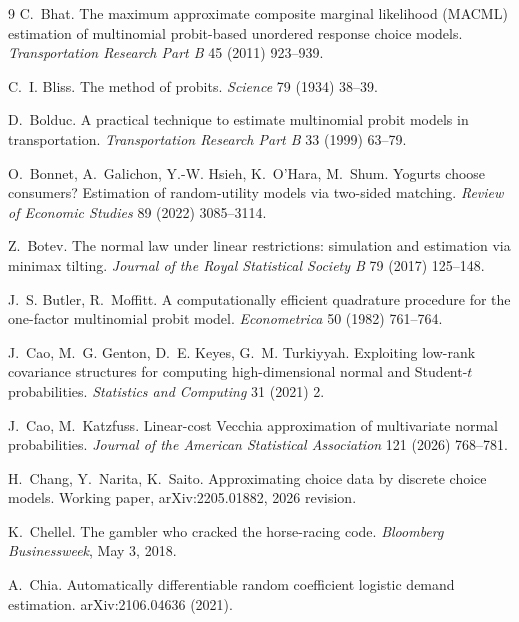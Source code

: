 \documentclass[12pt]{article}
\theoremstyle{remark}
\begin{document}
\begin{thebibliography}{9}
 C.~Bhat. The maximum approximate composite marginal
likelihood (MACML) estimation of multinomial probit-based unordered response
choice models. \emph{Transportation Research Part B} 45 (2011) 923--939.

 C.~I. Bliss. The method of probits.
\emph{Science} 79 (1934) 38--39.

 D.~Bolduc. A practical technique to
estimate multinomial probit models in transportation. \emph{Transportation
Research Part B} 33 (1999) 63--79.

 O.~Bonnet, A.~Galichon, Y.-W. Hsieh, K.~O'Hara,
M.~Shum. Yogurts choose consumers? Estimation of random-utility models
via two-sided matching. \emph{Review of Economic Studies} 89 (2022)
3085--3114.

 Z.~Botev. The normal law under linear restrictions:
simulation and estimation via minimax tilting. \emph{Journal of the
Royal Statistical Society B} 79 (2017)
125--148.

 J.~S. Butler, R.~Moffitt. A computationally efficient
quadrature procedure for the one-factor multinomial probit model.
\emph{Econometrica} 50 (1982) 761--764.

 J.~Cao, M.~G. Genton, D.~E. Keyes, G.~M. Turkiyyah.
Exploiting low-rank covariance structures for computing high-dimensional
normal and Student-$t$ probabilities. \emph{Statistics and Computing} 31
(2021) 2.

 J.~Cao, M.~Katzfuss.
Linear-cost Vecchia approximation of multivariate normal probabilities.
\emph{Journal of the American Statistical Association} 121 (2026)
768--781.

H.~Chang, Y.~Narita, K.~Saito. Approximating choice data by discrete
choice models. Working paper, arXiv:2205.01882, 2026 revision.

 K.~Chellel. The gambler who
cracked the horse-racing code. \emph{Bloomberg Businessweek}, May 3,
2018.

 A.~Chia. Automatically differentiable random coefficient
logistic demand estimation. arXiv:2106.04636 (2021).


\end{thebibliography}
\end{document}
